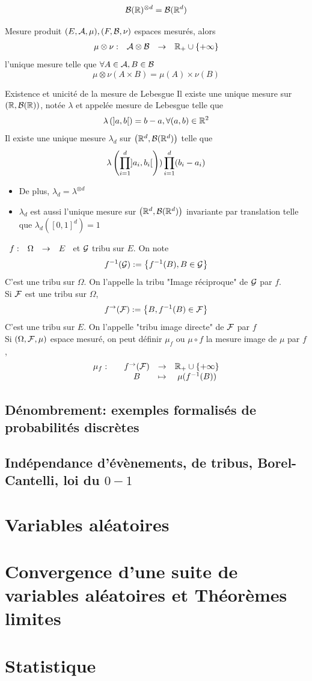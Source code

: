 \documentclass[]{report}
\begin{document}
\begin{prop}{}{}
    \[\mathcal{B}(\mathbb{R})^{\otimes d}=\mathcal{B} (\mathbb{R}^d)\]
\end{prop}

\begin{df}{Mesure produit}{}
    $(E,\mathcal{A},\mu),(F,\mathcal{B},\nu)$ espaces mesurés, alors
    \[\begin{array}{ccccc} \mu \otimes \nu : & \mathcal{A}\otimes \mathcal{B} & \to & \mathbb{R}_+\cup \{+\infty\} \end{array}\]
    l'unique mesure telle que $\forall A\in \mathcal{A},B\in \mathcal{B}$
    \[\mu\otimes \nu(A\times B)= \mu(A)\times \nu (B)\]
\end{df}

\begin{tm}{Existence et unicité de la mesure de Lebesgue}{}
    Il existe une unique mesure sur $(\mathbb{R},\mathcal{B}(\mathbb{R}))$, notée $\lambda$ et appelée mesure de Lebesgue telle que
    \[\lambda\left(]a,b[\right)=b-a,\forall (a,b)\in \mathbb{R}^2\]
    Il existe une unique mesure $\lambda_d$ sur $\left(\mathbb{R}^d,\mathcal{B}(\mathbb{R}^d)\right)$ telle que
    \[\lambda\left(\prod_{i=1}^{d} ]a_i,b_i[\right))\prod_{i=1}^{d}(b_i-a_i)\]
    \begin{itemize}
        \item De plus, $\lambda_d=\lambda^{\otimes d}$
        \item $\lambda_d$ est aussi l'unique mesure sur $\left(\mathbb{R}^d,\mathcal{B}(\mathbb{R}^d)\right)$ invariante par translation telle que $\lambda_d\left([0,1]^d\right)=1$
    \end{itemize}
\end{tm}

\begin{prop}{}{}
    $\begin{array}{ccccc} f : & \Omega & \to & E \end{array}$ et $\mathcal{G}$ tribu sur $E$. On note
    \[f^{-1}(\mathcal{G}):=\left\{f^{-1}(B),B\in \mathcal{G}\right\}\]
    C'est une tribu sur $\Omega$. On l'appelle la tribu "Image réciproque" de $\mathcal{G}$ par $f$.\\
    Si $\mathcal{F}$ est une tribu sur $\Omega$,
    \[f^{\to}(\mathcal{F}):=\left\{B,f^{-1}(B)\in \mathcal{F}\right\}\]
    C'est une tribu sur $E$. On l'appelle "tribu image directe" de $\mathcal{F}$ par $f$\\
    Si $(\Omega,\mathcal{F},\mu)$ espace mesuré, on peut définir $\mu_f$ ou $\mu\circ f$ la mesure image de $\mu$ par $f$,
    \[\begin{array}{ccccc} \mu_f : & & f^{\to}(\mathcal{F}) & \to & \mathbb{R}_+\cup \{+\infty\} \\ & & B & \mapsto & \mu(f^{-1}(B)) \end{array}\]
\end{prop}

\section{Dénombrement: exemples formalisés de probabilités discrètes}

\section{Indépendance d'évènements, de tribus, Borel-Cantelli, loi du $0-1$}

\chapter{Variables aléatoires}

\chapter{Convergence d'une suite de variables aléatoires et Théorèmes limites}

\chapter{Statistique}
\end{document}

